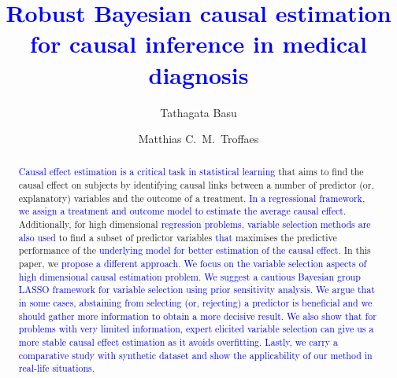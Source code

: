 \documentclass[preprint,12pt]{elsarticle}
\newcommand{\added}[1]{\textcolor{blue}{#1}}
\begin{document}
\begin{frontmatter}

\title{\added{Robust Bayesian causal estimation for causal inference in medical diagnosis}}
\author[1]{Tathagata Basu}
\author[2]{Matthias C.~M.~Troffaes}

\begin{abstract}
\added{Causal effect estimation is a critical task in statistical learning} that aims to find the causal effect on subjects
by identifying causal links between
a number of predictor (or, explanatory) variables and the outcome of a treatment. \added{In a regressional
framework, we assign a treatment and outcome model to
estimate the average causal effect.} Additionally, for high dimensional \added{regression problems, variable selection methods are also used} to find a subset of 
predictor variables \added{that} maximises the predictive performance of the \added{underlying model for better estimation of the causal effect.}  In this paper, we \added{propose a different approach. We focus on the variable selection aspects of
high dimensional causal estimation problem. We suggest a cautious
Bayesian group LASSO framework for variable selection using prior sensitivity analysis. We  argue that in some cases, abstaining from selecting (or, rejecting) a predictor is beneficial and we should gather more information to obtain a more decisive result. We also show that for problems with very limited information, expert elicited variable selection can give us a more stable causal effect estimation as it avoids overfitting. Lastly, we carry a comparative study with
synthetic dataset and show the applicability of our method in
real-life situations.}

\end{abstract}


\end{frontmatter}
\end{document}
